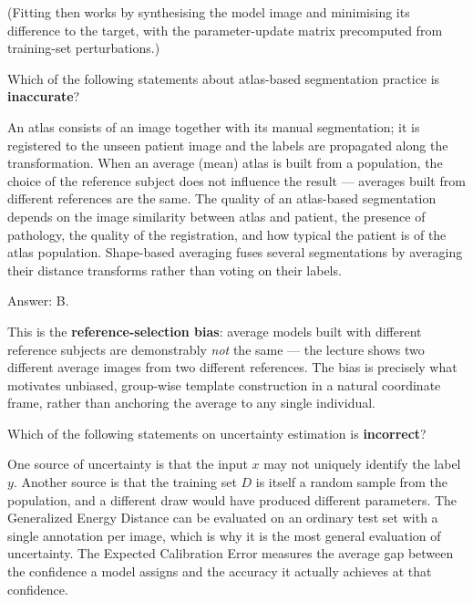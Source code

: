 \documentclass[11pt]{exam}
\newcommand{\answerspace}[1]{\ifprintanswers\else\vspace{#1}\fi}
\begin{document}
\begin{questions}
\begin{solution}
  (Fitting then works by synthesising the model image and minimising its difference to the target,
  with the parameter-update matrix precomputed from training-set perturbations.)
\end{solution}
\answerspace{7.5cm}

\question
Which of the following statements about atlas-based segmentation practice is \textbf{inaccurate}?

\begin{choices}
  \choice An atlas consists of an image together with its manual segmentation; it is registered to
  the unseen patient image and the labels are propagated along the transformation.
  \choice When an average (mean) atlas is built from a population, the choice of the reference
  subject does not influence the result --- averages built from different references are the same.
  \choice The quality of an atlas-based segmentation depends on the image similarity between atlas
  and patient, the presence of pathology, the quality of the registration, and how typical the
  patient is of the atlas population.
  \choice Shape-based averaging fuses several segmentations by averaging their distance transforms
  rather than voting on their labels.
\end{choices}

\begin{solution}
  Answer: B.

  This is the \textbf{reference-selection bias}: average models built with different reference
  subjects are demonstrably \emph{not} the same --- the lecture shows two different average images
  from two different references. The bias is precisely what motivates unbiased, group-wise
  template construction in a natural coordinate frame, rather than anchoring the average to any
  single individual.
\end{solution}

\question
Which of the following statements on uncertainty estimation is \textbf{incorrect}?

\begin{choices}
  \choice One source of uncertainty is that the input $x$ may not uniquely identify the label $y$.
  \choice Another source is that the training set $D$ is itself a random sample from the
  population, and a different draw would have produced different parameters.
  \choice The Generalized Energy Distance can be evaluated on an ordinary test set with a single
  annotation per image, which is why it is the most general evaluation of uncertainty.
  \choice The Expected Calibration Error measures the average gap between the confidence a model
  assigns and the accuracy it actually achieves at that confidence.
\end{choices}


\end{questions}
\end{document}
